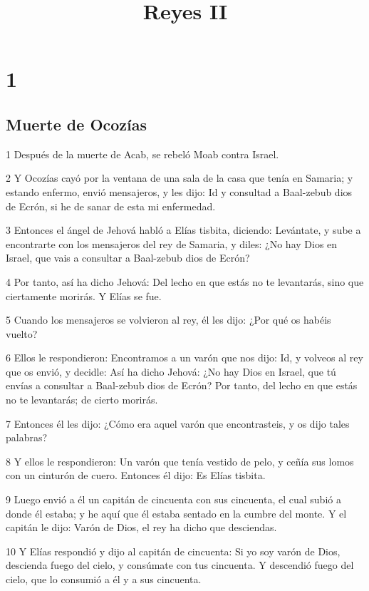 

\title{Reyes II}

\chapter{1}

\section*{Muerte de Ocozías}

\par 1 Después de la muerte de Acab, se rebeló Moab contra Israel.
\par 2 Y Ocozías cayó por la ventana de una sala de la casa que tenía en Samaria; y estando enfermo, envió mensajeros, y les dijo: Id y consultad a Baal-zebub dios de Ecrón, si he de sanar de esta mi enfermedad.
\par 3 Entonces el ángel de Jehová habló a Elías tisbita, diciendo: Levántate, y sube a encontrarte con los mensajeros del rey de Samaria, y diles: ¿No hay Dios en Israel, que vais a consultar a Baal-zebub dios de Ecrón?
\par 4 Por tanto, así ha dicho Jehová: Del lecho en que estás no te levantarás, sino que ciertamente morirás. Y Elías se fue.
\par 5 Cuando los mensajeros se volvieron al rey, él les dijo: ¿Por qué os habéis vuelto?
\par 6 Ellos le respondieron: Encontramos a un varón que nos dijo: Id, y volveos al rey que os envió, y decidle: Así ha dicho Jehová: ¿No hay Dios en Israel, que tú envías a consultar a Baal-zebub dios de Ecrón? Por tanto, del lecho en que estás no te levantarás; de cierto morirás.
\par 7 Entonces él les dijo: ¿Cómo era aquel varón que encontrasteis, y os dijo tales palabras?
\par 8 Y ellos le respondieron: Un varón que tenía vestido de pelo, y ceñía sus lomos con un cinturón de cuero. Entonces él dijo: Es Elías tisbita.
\par 9 Luego envió a él un capitán de cincuenta con sus cincuenta, el cual subió a donde él estaba; y he aquí que él estaba sentado en la cumbre del monte. Y el capitán le dijo: Varón de Dios, el rey ha dicho que desciendas.
\par 10 Y Elías respondió y dijo al capitán de cincuenta: Si yo soy varón de Dios, descienda fuego del cielo, y consúmate con tus cincuenta. Y descendió fuego del cielo, que lo consumió a él y a sus cincuenta.
